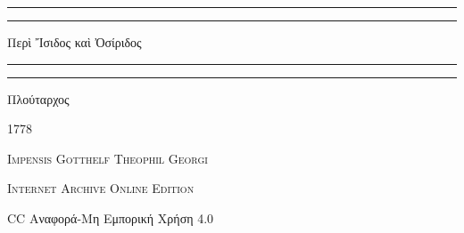 \documentclass[a4paper, 11pt, oneside, polutonikogreek, german, landscape]{article}
\begin{document}
\begin{titlepage} %
	\centering %


	\rule{\textwidth}{1.6pt}\vspace*{-\baselineskip}\vspace*{2pt} %
	\rule{\textwidth}{0.4pt} %
	
	\vspace{1\baselineskip} %
	
	{\Huge Περὶ Ἴσιδος καὶ Ὀσίριδος}
	
	\vspace{1\baselineskip} %

	\rule{\textwidth}{0.4pt}\vspace*{-\baselineskip}\vspace{3.2pt} %
	\rule{\textwidth}{1.6pt} %
	
	\vspace{1\baselineskip} %
	
	
	{\Large Πλούταρχος}
 
        \vspace{0.5\baselineskip}
	
	\vspace*{1\baselineskip} %
	
        {\scshape \normalsize } %

        \vspace*{\fill}    

	\vspace{1\baselineskip}

	{\small\scshape 1778}
	
	{\small\scshape{Impensis Gotthelf Theophil Georgi}}
	
	\vspace{0.5\baselineskip} %

        {\scshape Internet Archive Online Edition}%
    
	{\small CC Αναφορά-Μη Εμπορική Χρήση 4.0} %
\end{titlepage}
\setlength{\parskip}{1mm plus1mm minus1mm}
\clearpage
\large
\end{document}

